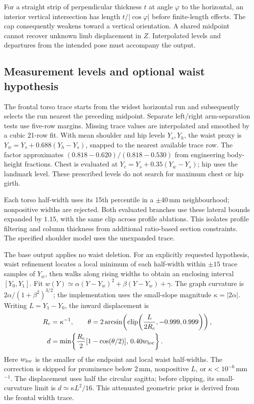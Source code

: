 \documentclass[11pt,a4paper]{article}
\newcommand{\clip}{\operatorname{clip}}
\begin{document}
For a straight strip of perpendicular thickness $t$ at angle $\varphi$ to the horizontal, an interior vertical intersection has length $t/|\cos\varphi|$ before finite-length effects. The cap consequently weakens toward a vertical orientation. A shared midpoint cannot recover unknown limb displacement in $Z$. Interpolated levels and departures from the intended pose must accompany the output.

\subsection{Measurement levels and optional waist hypothesis}
The frontal torso trace starts from the widest horizontal run and subsequently selects the run nearest the preceding midpoint. Separate left/right arm-separation tests use five-row margins. Missing trace values are interpolated and smoothed by a cubic 21-row fit. With mean shoulder and hip levels $Y_s,Y_h$, the waist proxy is $Y_w=Y_s+0.688(Y_h-Y_s)$, snapped to the nearest available trace row. The factor approximates $(0.818-0.620)/(0.818-0.530)$ from engineering body-height fractions. Chest is evaluated at $Y_c=Y_s+0.35(Y_w-Y_s)$; hip uses the landmark level. These prescribed levels do not search for maximum chest or hip girth.

Each torso half-width uses its 15th percentile in a $\pm40$\,mm neighbourhood; nonpositive widths are rejected. Both evaluated branches use these lateral bounds expanded by $1.15$, with the same clip across profile ablations. This isolates profile filtering and column thickness from additional ratio-based section constraints. The specified shoulder model uses the unexpanded trace.

The base output applies no waist deletion. For an explicitly requested hypothesis, waist refinement locates a local minimum of each half-width within $\pm15$ trace samples of $Y_w$, then walks along rising widths to obtain an enclosing interval $[Y_0,Y_1]$. Fit $w(Y)\simeq\alpha(Y-Y_w)^2+\beta(Y-Y_w)+\gamma$. The graph curvature is $2\alpha/(1+\beta^2)^{3/2}$; the implementation uses the small-slope magnitude $\kappa=|2\alpha|$. Writing $L=Y_1-Y_0$, the inward displacement is
\begin{equation}
 \begin{aligned}
 R_c&=\kappa^{-1},\qquad
 \theta=2\arcsin\!\left(\clip\!\left(\frac{L}{2R_c},-0.999,0.999\right)\right),\\
 d&=\min\!\left\{\frac{R_c}{2}[1-\cos(\theta/2)],\,0.40w_{\rm loc}\right\}.
 \end{aligned}
 \label{eq:waist}
\end{equation}
Here $w_{\rm loc}$ is the smaller of the endpoint and local waist half-widths. The correction is skipped for prominence below 2\,mm, nonpositive $L$, or $\kappa<10^{-6}$\,mm$^{-1}$. The displacement uses half the circular sagitta; before clipping, its small-curvature limit is $d\simeq\kappa L^2/16$. This attenuated geometric prior is derived from the frontal width trace.
\end{document}

